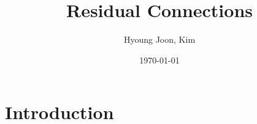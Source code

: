 \documentclass{report}
\title{Residual Connections}
\author{Hyoung Joon, Kim}
\date{\today}
\begin{document}
\maketitle
\tableofcontents
\newpage

\chapter{Introduction}
\end{document}
